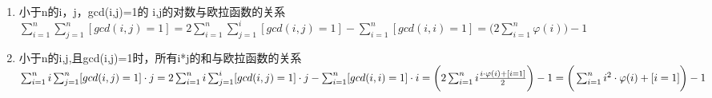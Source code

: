 \begin{enumerate}
\item 小于n的i，j，gcd(i,j)=1的 i,j的对数与欧拉函数的关系 $\sum_{i=1}^n\sum_{j=1}^n[gcd(i,j)=1]=2\sum_{i=1}^n\sum_{j=1}^i[gcd(i,j)=1]-\sum_{i=1}^n[gcd(i,i)=1]=\big(2\sum_{i=1}^n\varphi(i)\big)-1$

\item 小于n的i,j,且gcd(i,j)=1时，所有i*j的和与欧拉函数的关系 $\sum_{i=1}^{n}i\sum_{j=1}^{n}[gcd(i,j)=1]\cdot j=2\sum_{i=1}^{n}i\sum_{j=1}^i[gcd(i,j)=1]\cdot j-\sum_{i=1}^n[gcd(i,i)=1]\cdot i\\
=\bigg(2\sum_{i=1}^ni\frac{i\cdot\varphi(i)+[i=1]}{2}\bigg)-1=\bigg(\sum_{i=1}^ni^2\cdot\varphi(i)+[i=1]\bigg)-1$
\end{enumerate}